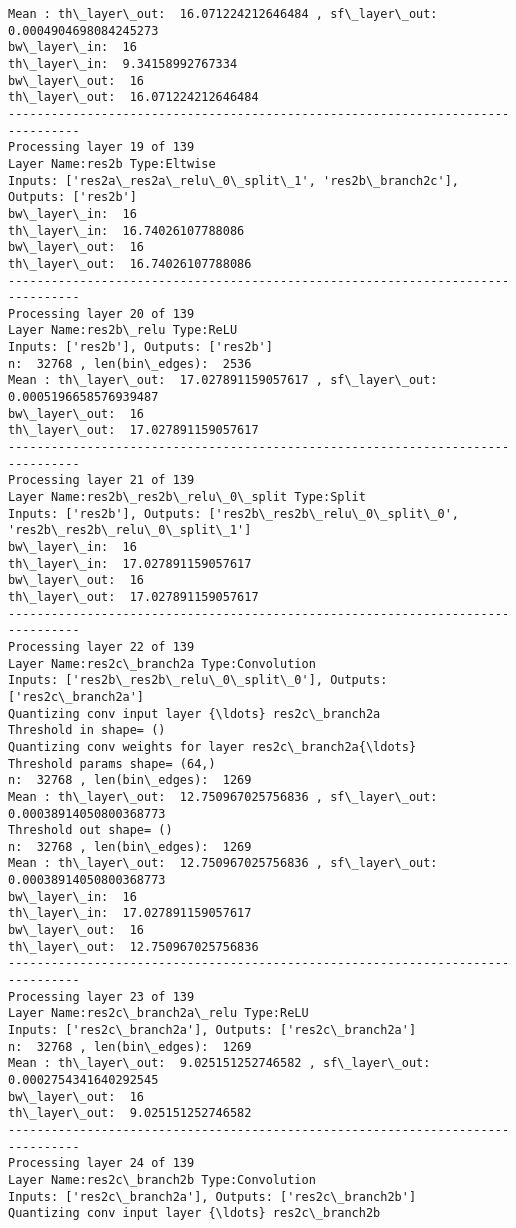 \documentclass[11pt]{article}
\begin{document}
\begin{Verbatim}[commandchars=\\\{\}]
Mean : th\_layer\_out:  16.071224212646484 , sf\_layer\_out:  0.0004904698084245273
bw\_layer\_in:  16
th\_layer\_in:  9.34158992767334
bw\_layer\_out:  16
th\_layer\_out:  16.071224212646484
--------------------------------------------------------------------------------
Processing layer 19 of 139
Layer Name:res2b Type:Eltwise
Inputs: ['res2a\_res2a\_relu\_0\_split\_1', 'res2b\_branch2c'], Outputs: ['res2b']
bw\_layer\_in:  16
th\_layer\_in:  16.74026107788086
bw\_layer\_out:  16
th\_layer\_out:  16.74026107788086
--------------------------------------------------------------------------------
Processing layer 20 of 139
Layer Name:res2b\_relu Type:ReLU
Inputs: ['res2b'], Outputs: ['res2b']
n:  32768 , len(bin\_edges):  2536
Mean : th\_layer\_out:  17.027891159057617 , sf\_layer\_out:  0.0005196658576939487
bw\_layer\_out:  16
th\_layer\_out:  17.027891159057617
--------------------------------------------------------------------------------
Processing layer 21 of 139
Layer Name:res2b\_res2b\_relu\_0\_split Type:Split
Inputs: ['res2b'], Outputs: ['res2b\_res2b\_relu\_0\_split\_0', 'res2b\_res2b\_relu\_0\_split\_1']
bw\_layer\_in:  16
th\_layer\_in:  17.027891159057617
bw\_layer\_out:  16
th\_layer\_out:  17.027891159057617
--------------------------------------------------------------------------------
Processing layer 22 of 139
Layer Name:res2c\_branch2a Type:Convolution
Inputs: ['res2b\_res2b\_relu\_0\_split\_0'], Outputs: ['res2c\_branch2a']
Quantizing conv input layer {\ldots} res2c\_branch2a
Threshold in shape= ()
Quantizing conv weights for layer res2c\_branch2a{\ldots}
Threshold params shape= (64,)
n:  32768 , len(bin\_edges):  1269
Mean : th\_layer\_out:  12.750967025756836 , sf\_layer\_out:  0.00038914050800368773
Threshold out shape= ()
n:  32768 , len(bin\_edges):  1269
Mean : th\_layer\_out:  12.750967025756836 , sf\_layer\_out:  0.00038914050800368773
bw\_layer\_in:  16
th\_layer\_in:  17.027891159057617
bw\_layer\_out:  16
th\_layer\_out:  12.750967025756836
--------------------------------------------------------------------------------
Processing layer 23 of 139
Layer Name:res2c\_branch2a\_relu Type:ReLU
Inputs: ['res2c\_branch2a'], Outputs: ['res2c\_branch2a']
n:  32768 , len(bin\_edges):  1269
Mean : th\_layer\_out:  9.025151252746582 , sf\_layer\_out:  0.0002754341640292545
bw\_layer\_out:  16
th\_layer\_out:  9.025151252746582
--------------------------------------------------------------------------------
Processing layer 24 of 139
Layer Name:res2c\_branch2b Type:Convolution
Inputs: ['res2c\_branch2a'], Outputs: ['res2c\_branch2b']
Quantizing conv input layer {\ldots} res2c\_branch2b

\end{Verbatim}
\end{document}
